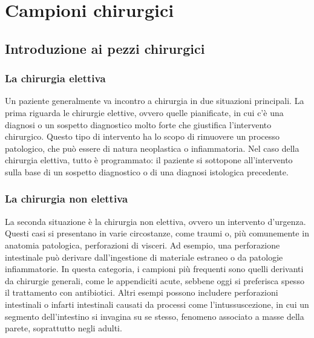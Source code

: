 \chapter{Campioni chirurgici}

\section{Introduzione ai pezzi chirurgici}

\subsection{La chirurgia elettiva}
Un paziente generalmente va incontro a chirurgia in due situazioni principali. La prima riguarda le chirurgie elettive, ovvero quelle pianificate, in cui c'è una diagnosi o un sospetto diagnostico molto forte che giustifica l’intervento chirurgico. Questo tipo di intervento ha lo scopo di rimuovere un processo patologico, che può essere di natura neoplastica o infiammatoria. Nel caso della chirurgia elettiva, tutto è programmato: il paziente si sottopone all’intervento sulla base di un sospetto diagnostico o di una diagnosi istologica precedente.

\subsection{La chirurgia non elettiva}
La seconda situazione è la chirurgia non elettiva, ovvero un intervento d'urgenza. Questi casi si presentano in varie circostanze, come traumi o, più comunemente in anatomia patologica, perforazioni di visceri. Ad esempio, una perforazione intestinale può derivare dall'ingestione di materiale estraneo o da patologie infiammatorie. In questa categoria, i campioni più frequenti sono quelli derivanti da chirurgie generali, come le appendiciti acute, sebbene oggi si preferisca spesso il trattamento con antibiotici. Altri esempi possono includere perforazioni intestinali o infarti intestinali causati da processi come l'intussuscezione, in cui un segmento dell'intestino si invagina su se stesso, fenomeno associato a masse della parete, soprattutto negli adulti.

